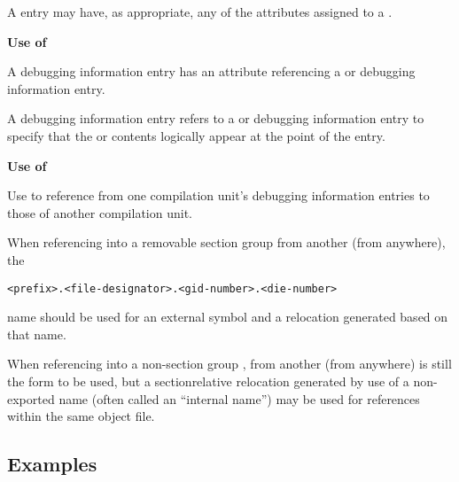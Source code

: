 A  entry may have, as appropriate, any of
the attributes assigned to a .


\textbf{Use of }

A  debugging information entry has an
 attribute referencing a  or
 debugging information entry.

A  debugging information entry refers
to a 
 or 
 debugging
information entry to specify that the 
 or
 contents logically appear at the point
of the 
 entry.


\textbf{Use of }

Use 
 to reference from one compilation
unit's debugging information entries to those of another
compilation unit.

When referencing into a removable section group 
from another  (from anywhere), the
\begin{alltt}
<prefix>.<file-designator>.<gid-number>.<die-number>
\end{alltt}
name should be used for an external symbol and a relocation
generated based on that name.

When referencing into a non-section group 
,
from another  (from anywhere) 
 is
still the form to be used, but a section\dash relative relocation
generated by use of a non-exported name (often called an
``internal name'') may be used for references within the
same object file.

\subsection{Examples}
\label{app:examples}


